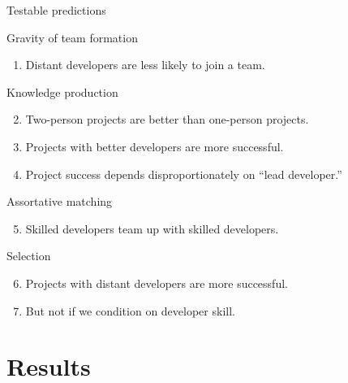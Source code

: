 \documentclass[
  ignorenonframetext,
  aspectratio=169,
]{beamer}
\providecommand{\tightlist}{%
  \setlength{\itemsep}{0pt}\setlength{\parskip}{0pt}}
\begin{document}
\begin{frame}{Testable predictions}
\protect\hypertarget{testable-predictions-1}{}
\begin{block}{Gravity of team formation}
\protect\hypertarget{gravity-of-team-formation}{}
\begin{enumerate}
\tightlist
\item
  Distant developers are less likely to join a team.
\end{enumerate}
\end{block}

\begin{block}{Knowledge production}
\protect\hypertarget{knowledge-production}{}
\begin{enumerate}
\setcounter{enumi}{1}
\tightlist
\item
  Two-person projects are better than one-person projects.
\item
  Projects with better developers are more successful.
\item
  Project success depends disproportionately on ``lead developer.''
\end{enumerate}
\end{block}

\begin{block}{Assortative matching}
\protect\hypertarget{assortative-matching}{}
\begin{enumerate}
\setcounter{enumi}{4}
\tightlist
\item
  Skilled developers team up with skilled developers.
\end{enumerate}
\end{block}

\begin{block}{Selection}
\protect\hypertarget{selection-1}{}
\begin{enumerate}
\setcounter{enumi}{5}
\tightlist
\item
  Projects with distant developers are more successful.
\item
  But not if we condition on developer skill.
\end{enumerate}
\end{block}
\end{frame}

\section{Results}\label{results}
\end{document}
